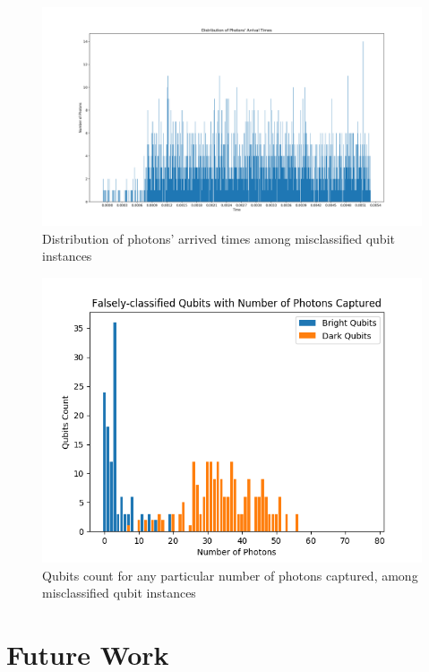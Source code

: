\documentclass[letterpaper,twocolumn,10pt]{article}
\begin{document}
\begin{figure}[]
    \includegraphics[width=\linewidth]{Figures/misclassified_photons_distro.png}
    \centering
    \caption{Distribution of photons' arrived times among misclassified qubit instances}
    \label{fig:misclassified_photons_distro}
\end{figure}

\begin{figure}[]
    \includegraphics[width=\linewidth]{Figures/misclassifed_photons_count.png}
    \centering
    \caption{Qubits count for any particular number of photons captured, among misclassified qubit instances}
    \label{fig:misclassifed_photons_count}
\end{figure}

\section{Future Work}
\end{document}
